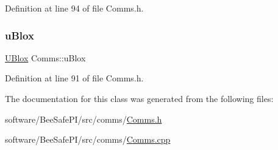 Definition at line 94 of file Comms.\+h.

\mbox{\label{class_comms_ac64dea134b116147e5441172346dbd6c}} 
\subsubsection{\texorpdfstring{u\+Blox}{uBlox}}
{\footnotesize\ttfamily \hyperlink{class_u_blox}{U\+Blox} Comms\+::u\+Blox\hspace{0.3cm}{\ttfamily [private]}}



Definition at line 91 of file Comms.\+h.



The documentation for this class was generated from the following files\+:\begin{DoxyCompactItemize}
\item 
software/\+Bee\+Safe\+P\+I/src/comms/\hyperlink{_comms_8h}{Comms.\+h}\item 
software/\+Bee\+Safe\+P\+I/src/comms/\hyperlink{_comms_8cpp}{Comms.\+cpp}\end{DoxyCompactItemize}
